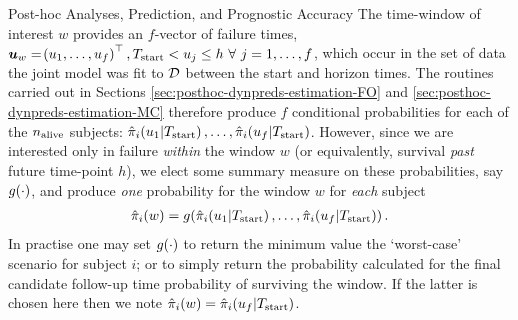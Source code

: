 \begin{chapter}{\label{cha:posthoc}Post-hoc Analyses, Prediction, and Prognostic Accuracy}
The time-window of interest $w$ provides an $f$-vector of failure times, $\bm{u}_w=\lb u_1,\dots,u_f\rb^\top, \Tstart < u_j \le h\ \forall\ j=1,\dots,f$, which occur in the set of data the joint model was fit to $\cal D$ between the start and horizon times. The routines carried out in Sections \ref{sec:posthoc-dynpreds-estimation-FO} and \ref{sec:posthoc-dynpreds-estimation-MC} therefore produce $f$ conditional probabilities for each of the $n_{\mathrm{alive}}$ subjects: $\hat{\pi}_i\!\left( u_1|T_{\mathrm{start}}\right),\dots,\hat{\pi}_i\!\left( u_f|T_{\mathrm{start}}\right)$. However, since we are interested only in failure \textit{within} the window $w$ (or equivalently, survival \textit{past} future time-point $h$), we elect some summary measure on these probabilities, say $g\!\left(\cdot\right)$, and produce \textit{one} probability for the window $w$ for \textit{each} subject
\begin{align*}
    \hat{\pi}_i\!\left( w\right)=g\!\left(\hat{\pi}_i\!\left( u_1|T_{\mathrm{start}}\right),\dots,\hat{\pi}_i\!\left( u_f|T_{\mathrm{start}}\right)\right).
\end{align*}
In practise one may set $g\!\left(\cdot\right)$ to return the minimum value \ie the `worst-case' scenario for subject $i$; or to simply return the probability calculated for the final candidate follow-up time \ie probability of surviving the window. If the latter is chosen here then we note $\hat{\pi}_i\!\left( w\right)=\hat{\pi}_i\!\left( u_f|T_{\mathrm{start}}\right)$.


\end{chapter}
